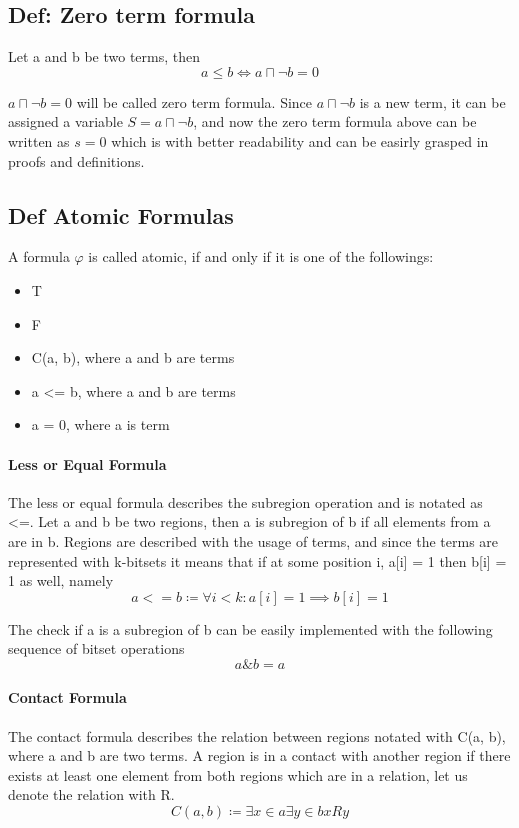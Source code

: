 \documentclass{article}
\begin{document}
	\subsection*{Def: Zero term formula}
		Let a and b be two terms, then
		\begin{equation}
			a \le b \iff a \sqcap \neg b = 0
		\end{equation}

		$a \sqcap \neg b = 0$ will be called zero term formula.
		Since $a \sqcap \neg b$ is a new term, it can be assigned a variable $S = a \sqcap \neg b$, 
		and now the zero term formula above can be written as $s  = 0$ which is with better readability and 
		can be easirly grasped in proofs and definitions.


	\subsection*{Def Atomic Formulas}
		A formula $\varphi$ is called atomic, if and only if it is one of the followings:
		\begin{itemize}
			\item T
			\item F
			\item C(a, b), where a and b are terms
			\item a <= b, where a and b are terms
			\item a = 0, where a is term
		\end{itemize}
		
	\paragraph{Less or Equal Formula} The less or equal formula describes the subregion operation and is notated as <=.
	Let a and b be two regions, then a is subregion of b if all elements from a are in b.
	Regions are described with the usage of terms, and since the terms are represented with k-bitsets it means that 
	if at some position i, a[i] = 1 then b[i] = 1 as well, namely
	\begin{equation}
		a <= b \coloneqq \forall i < k : a[i] = 1 \implies b[i]=1
	\end{equation}

	The check if a is a subregion of b can be easily implemented with the following sequence of bitset operations
	\begin{equation}
		a \& b = a
	\end{equation}

	\paragraph{Contact Formula} The contact formula describes the relation between regions notated with C(a, b), where a and b are two terms.
	A region is in a contact with another region if there exists at least one element from both regions which are in a relation, let us denote the relation with R.
	\begin{equation}
		C(a, b) \coloneqq \exists x \in a \exists y \in b xRy
	\end{equation}
\end{document}

